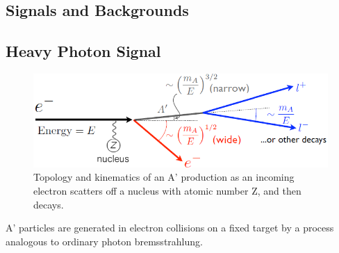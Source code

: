 \documentclass[b1]{sciposter}
\begin{document}
\begin{multicols}{3}
	\section*{Signals and Backgrounds}
	\subsection*{Heavy Photon Signal}
%

\begin{figure}
		\begin{center}
			\includegraphics[width=\textwidth]{ap_kine_topokinematics}
		\end{center}
		\caption{Topology and kinematics of an A' production as an incoming electron scatters off a nucleus with atomic number Z, and then decays.}
	\end{figure}


	A' particles are generated in electron collisions on a fixed target by a process analogous to
	ordinary photon bremsstrahlung.



\end{multicols}
\end{document}
